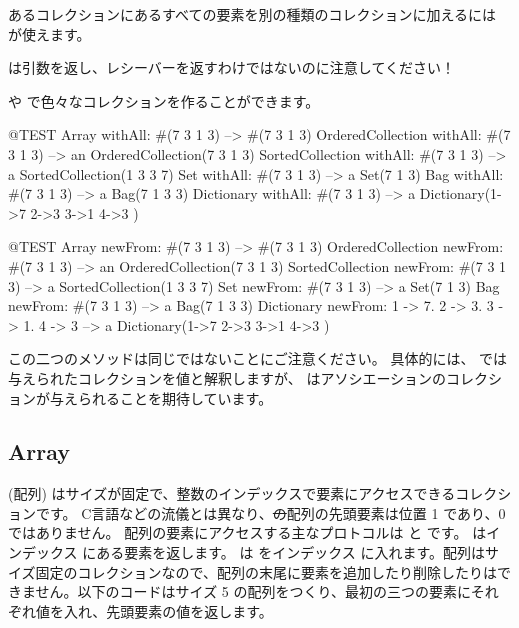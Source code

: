 \documentclass[a4paper,10pt,twoside]{book}
\begin{document}
あるコレクションにあるすべての要素を別の種類のコレクションに加えるには  が使えます。

\noindent
{} は引数を返し、レシーバーを返すわけではないのに注意してください！

 や  で色々なコレクションを作ることができます。

\begin{code}{@TEST}
Array withAll: #(7 3 1 3)                      --> #(7 3 1 3)
OrderedCollection withAll: #(7 3 1 3) --> an OrderedCollection(7 3 1 3)
SortedCollection withAll: #(7 3 1 3)    --> a SortedCollection(1 3 3 7)
Set withAll: #(7 3 1 3)                         --> a Set(7 1 3)
Bag withAll: #(7 3 1 3)                        --> a Bag(7 1 3 3)
Dictionary withAll: #(7 3 1 3)               --> a Dictionary(1->7 2->3 3->1 4->3 )
\end{code}

\begin{code}{@TEST}
Array newFrom: #(7 3 1 3)                                          --> #(7 3 1 3)
OrderedCollection newFrom: #(7 3 1 3)                     --> an OrderedCollection(7 3 1 3)
SortedCollection newFrom: #(7 3 1 3)                       --> a SortedCollection(1 3 3 7)
Set newFrom: #(7 3 1 3)                                            --> a Set(7 1 3)
Bag newFrom: #(7 3 1 3)                                           --> a Bag(7 1 3 3)
Dictionary newFrom: {1 -> 7. 2 -> 3. 3 -> 1. 4 -> 3} --> a Dictionary(1->7 2->3 3->1 4->3 )
\end{code}
\noindent
この二つのメソッドは同じではないことにご注意ください。
具体的には、 では与えられたコレクションを値と解釈しますが、 はアソシエーションのコレクションが与えられることを期待しています。

\subsection{Array}
 (配列) はサイズが固定で、整数のインデックスで要素にアクセスできるコレクションです。
C言語などの流儀とは異なり、\st の配列の先頭要素は位置 1 であり、0 ではありません。
配列の要素にアクセスする主なプロトコルは  と  です。 はインデックス  にある要素を返します。 は  をインデックス  に入れます。配列はサイズ固定のコレクションなので、配列の末尾に要素を追加したり削除したりはできません。以下のコードはサイズ 5 の配列をつくり、最初の三つの要素にそれぞれ値を入れ、先頭要素の値を返します。
\end{document}

